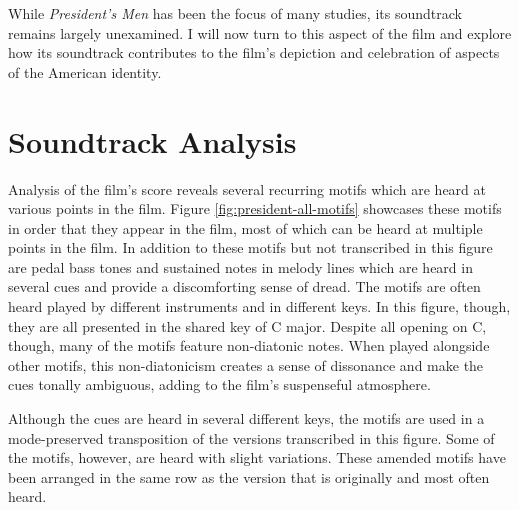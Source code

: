 While \textit{President’s Men }has been the focus of many studies, its soundtrack remains largely unexamined.
I will now turn to this aspect of the film and explore how its soundtrack contributes to the film’s depiction and celebration of aspects of the American identity.

\section{ Soundtrack Analysis}

Analysis of the film's score reveals several recurring motifs which are heard at various points in the film.
Figure \ref{fig:president-all-motifs} showcases these motifs in order that they appear in the film, most of which can be heard at multiple points in the film.
In addition to these motifs but not transcribed in this figure are pedal bass tones and sustained notes in melody lines which are heard in several cues and provide a discomforting sense of dread.
The motifs are often heard played by different instruments and in different keys.
In this figure, though, they are all presented in the shared key of C major.
Despite all opening on C, though, many of the motifs feature non-diatonic notes.
When played alongside other motifs, this non-diatonicism creates a sense of dissonance and make the cues tonally ambiguous, adding to the film’s suspenseful atmosphere.

Although the cues are heard in several different keys, the motifs are used in a mode-preserved transposition of the versions transcribed in this figure.
Some of the motifs, however, are heard with slight variations.
These amended motifs have been arranged in the same row as the version that is originally and most often heard.

